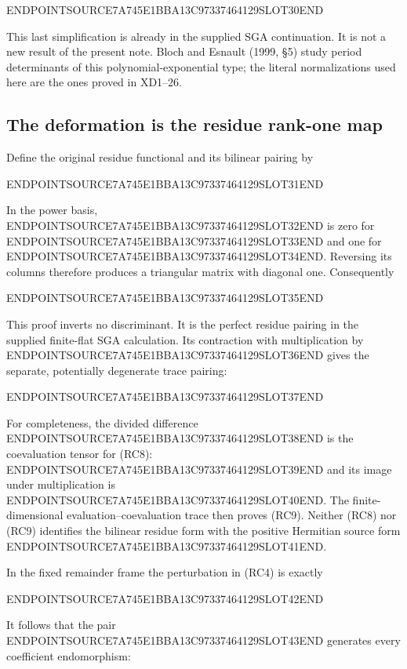 ENDPOINTSOURCE7A745E1BBA13C97337464129SLOT30END

This last simplification is already in the supplied SGA continuation. It is not a new result of the present note. Bloch and Esnault (1999, §5) study period determinants of this polynomial-exponential type; the literal normalizations used here are the ones proved in XD1--26.

\subsection{The deformation is the residue rank-one map}\label{endpoint-residue_original--the-deformation-is-the-residue-rank-one-map}

Define the original residue functional and its bilinear pairing by

ENDPOINTSOURCE7A745E1BBA13C97337464129SLOT31END

In the power basis, ENDPOINTSOURCE7A745E1BBA13C97337464129SLOT32END is zero for ENDPOINTSOURCE7A745E1BBA13C97337464129SLOT33END and one for ENDPOINTSOURCE7A745E1BBA13C97337464129SLOT34END. Reversing its columns therefore produces a triangular matrix with diagonal one. Consequently

ENDPOINTSOURCE7A745E1BBA13C97337464129SLOT35END

This proof inverts no discriminant. It is the perfect residue pairing in the supplied finite-flat SGA calculation. Its contraction with multiplication by ENDPOINTSOURCE7A745E1BBA13C97337464129SLOT36END gives the separate, potentially degenerate trace pairing:

ENDPOINTSOURCE7A745E1BBA13C97337464129SLOT37END

For completeness, the divided difference ENDPOINTSOURCE7A745E1BBA13C97337464129SLOT38END is the coevaluation tensor for (RC8): ENDPOINTSOURCE7A745E1BBA13C97337464129SLOT39END and its image under multiplication is ENDPOINTSOURCE7A745E1BBA13C97337464129SLOT40END. The finite-dimensional evaluation--coevaluation trace then proves (RC9). Neither (RC8) nor (RC9) identifies the bilinear residue form with the positive Hermitian source form ENDPOINTSOURCE7A745E1BBA13C97337464129SLOT41END.

In the fixed remainder frame the perturbation in (RC4) is exactly

ENDPOINTSOURCE7A745E1BBA13C97337464129SLOT42END

It follows that the pair ENDPOINTSOURCE7A745E1BBA13C97337464129SLOT43END generates every coefficient endomorphism:

